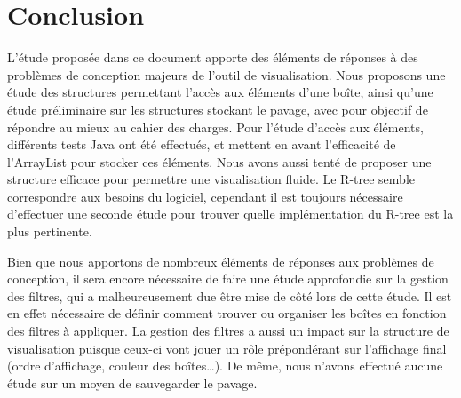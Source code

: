 \chapter{Conclusion}
L'étude proposée dans ce document apporte des éléments de réponses à des problèmes de conception majeurs de l'outil de visualisation. Nous proposons une étude des structures permettant l'accès aux éléments d'une boîte, ainsi qu'une étude préliminaire sur les structures stockant le pavage, avec pour objectif de répondre au mieux au cahier des charges. Pour l'étude d'accès aux éléments, différents tests Java ont été effectués, et mettent en avant l'efficacité de l'ArrayList pour stocker ces éléments. Nous avons aussi tenté de proposer une structure efficace pour permettre une visualisation fluide. Le R-tree semble correspondre aux besoins du logiciel, cependant il est toujours nécessaire d'effectuer une seconde étude pour trouver quelle implémentation du R-tree est la plus pertinente.

Bien que nous apportons de nombreux éléments de réponses aux problèmes de conception, il sera encore nécessaire de faire une étude approfondie sur la gestion des filtres, qui a malheureusement due être mise de côté lors de cette étude. Il est en effet nécessaire de définir comment trouver ou organiser les boîtes en fonction des filtres à appliquer. La gestion des filtres a aussi un impact sur la structure de visualisation puisque ceux-ci vont jouer un rôle prépondérant sur l'affichage final (ordre d'affichage, couleur des boîtes\dots). De même, nous n'avons effectué aucune étude sur un moyen de sauvegarder le pavage.
